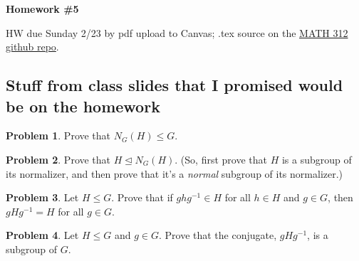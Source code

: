 \documentclass[12pt]{article}
\theoremstyle{definition} %
\newtheorem{problem}{Problem}
\newcommand\inv{^{-1}} %
\def\normaleq{\unlhd}
\renewcommand{\section}[1]{\begin{center} \textbf{#1} \\\end{center}}
\begin{document}
\section{Homework \#5} %

HW due Sunday 2/23 by pdf upload to Canvas; .tex source on the \href{https://github.com/rhinopotamus/math312}{MATH 312 github repo}.

\subsection*{Stuff from class slides that I promised would be on the homework}

\begin{problem}
    Prove that $N_G(H) \leq G$.
\end{problem}

\begin{problem}
    Prove that $H\normaleq N_G(H)$. (So, first prove that $H$ is a subgroup of its normalizer, and then prove that it's a \textit{normal} subgroup of its normalizer.)
\end{problem}

\begin{problem}
    Let $H\leq G$. Prove that if $ghg\inv \in H$ for all $h\in H$ and $g\in G$, then $gHg\inv = H$ for all $g\in G$.
\end{problem}

\begin{problem}
    Let $H\leq G$ and $g\in G$. Prove that the conjugate, $gHg\inv$, is a subgroup of $G$.
\end{problem}
\end{document}
